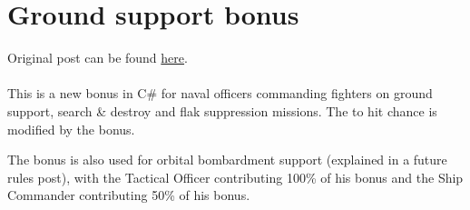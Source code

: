 \documentclass[../../Aurora C# unofficial manual.tex]{subfiles}
\begin{document}
	\section{Ground support bonus}
	Original post can be found
	\href{http://aurora2.pentarch.org/index.php?topic=8495.msg110281#msg110281}{here}.
	\\\\
	
	This is a new bonus in C\# for naval officers commanding fighters on ground support, search \& destroy and flak suppression missions. The to hit chance is modified by the bonus.
	
	The bonus is also used for orbital bombardment support (explained in a future rules post), with the Tactical Officer contributing 100\% of his bonus and the Ship Commander contributing 50\% of his bonus.
	
\end{document}
